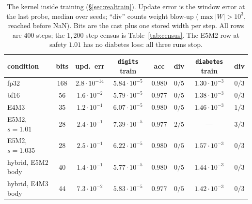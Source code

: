 \begin{table}[h]
\centering
\caption{The kernel inside training (\S\ref{sec:realtrain}).  Update error is the window
error at the last probe, median over seeds; ``div'' counts weight blow-up
($\max|W|>10^{3}$, reached before NaN).  Bits are the cast plus one stored width per
step.  All rows are $400$ steps; the $1{,}200$-step census is Table~\ref{tab:census}.
The E5M2 row at safety $1.01$ has no diabetes loss: all three runs stop.}
\label{tab:realtrain}
\begin{tabular}{lccccccc}
\toprule
condition & bits & upd.\ err & \texttt{digits} train & acc & div & \texttt{diabetes} train & div \\
\midrule
fp32              & 168 & $2.8\cdot10^{-14}$ & $5.84\cdot10^{-5}$ & $0.980$ & $0/5$ & $1.30\cdot10^{-3}$ & $0/3$ \\
bf16              & 56  & $1.6\cdot10^{-2}$  & $5.79\cdot10^{-5}$ & $0.977$ & $0/5$ & $1.38\cdot10^{-3}$ & $0/3$ \\
E4M3              & 35  & $1.2\cdot10^{-1}$  & $6.07\cdot10^{-5}$ & $0.980$ & $0/5$ & $1.46\cdot10^{-3}$ & $1/3$ \\
E5M2, $s=1.01$    & 28  & $2.4\cdot10^{-1}$  & $7.39\cdot10^{-5}$ & $0.977$ & $2/5$ & --- & $3/3$ \\
E5M2, $s=1.035$   & 28  & $2.5\cdot10^{-1}$  & $6.22\cdot10^{-5}$ & $0.980$ & $0/5$ & $1.57\cdot10^{-3}$ & $0/3$ \\
hybrid, E5M2 body & 40  & $1.4\cdot10^{-1}$  & $5.77\cdot10^{-5}$ & $0.980$ & $0/5$ & $1.44\cdot10^{-3}$ & $0/3$ \\
hybrid, E4M3 body & 44  & $7.3\cdot10^{-2}$  & $5.83\cdot10^{-5}$ & $0.977$ & $0/5$ & $1.42\cdot10^{-3}$ & $0/3$ \\
\bottomrule
\end{tabular}
\end{table}

